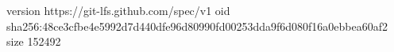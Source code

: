 version https://git-lfs.github.com/spec/v1
oid sha256:48ce3cfbe4e5992d7d440dfe96d80990fd00253dda9f6d080f16a0ebbea60af2
size 152492
